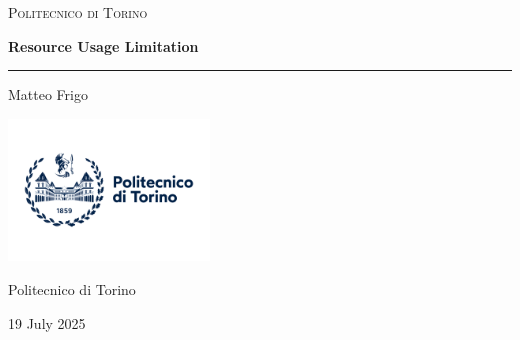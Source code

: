 \begin{titlepage}
  \centering

  {\Large\scshape Politecnico di Torino \par}

  \vspace{3cm}

  {\LARGE\bfseries\color{blue} Resource Usage Limitation \par}
  \vspace{0.5cm}
  \hrule
  \vspace{3cm}

  {\large Matteo Frigo \par}

  \vfill

  \includegraphics[width=0.4\textwidth]{images/polito_logo.jpg}

  \vspace{0.5cm}
  {\Large Politecnico di Torino \par}
\vspace{1.5cm} {\large 19 July 2025 \par}

\end{titlepage}